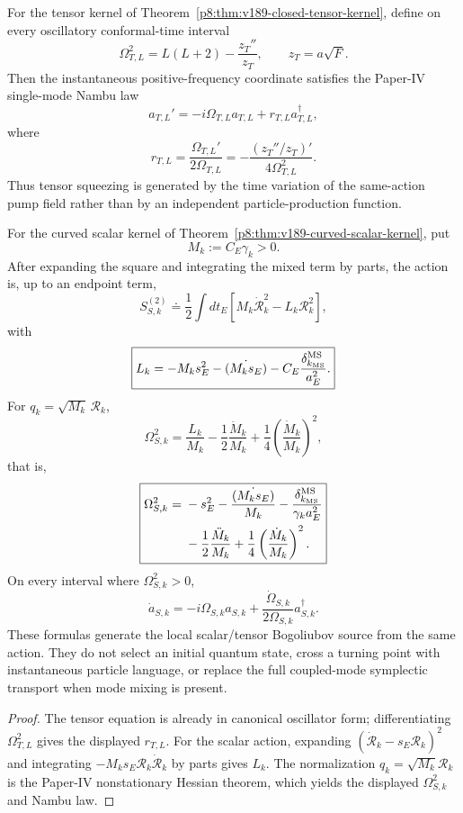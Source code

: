 \documentclass[12pt,a4paper]{article}
\begin{document}
\begin{theorem}
\label{p8:thm:v245-canonical-cosmological-oscillators}
For the tensor kernel of
Theorem~\ref{p8:thm:v189-closed-tensor-kernel}, define on every oscillatory
conformal-time interval
\[
 \boxed{\Omega_{T,L}^2
 =L(L+2)-\frac{z_T''}{z_T}},\qquad z_T=a\sqrt F.
\]
Then the instantaneous positive-frequency coordinate satisfies the Paper-IV
single-mode Nambu law
\[
 \boxed{a_{T,L}'=-i\Omega_{T,L}a_{T,L}
 +r_{T,L}a_{T,L}^\dagger},
\]
where
\[
 \boxed{r_{T,L}=\frac{\Omega_{T,L}'}{2\Omega_{T,L}}
 =-\frac{(z_T''/z_T)'}{4\Omega_{T,L}^2}.}
\]
Thus tensor squeezing is generated by the time variation of the same-action
pump field rather than by an independent particle-production function.

For the curved scalar kernel of
Theorem~\ref{p8:thm:v189-curved-scalar-kernel}, put
\[
 M_k:=C_E\gamma_k>0.
\]
After expanding the square and integrating the mixed term by parts, the action
is, up to an endpoint term,
\[
 S_{S,k}^{(2)}\doteq\frac12\int dt_E
 \left[M_k\dot{\mathcal R}_k^2-L_k\mathcal R_k^2\right],
\]
with
\[
 \boxed{L_k=-M_ks_E^2-\dot{(M_ks_E)}
 -C_E\frac{\delta_{k_{\rm MS}}^{\rm MS}}{a_E^2}.}
\]
For \(q_k=\sqrt{M_k}\,\mathcal R_k\),
\[
 \boxed{
 \Omega_{S,k}^2
 =\frac{L_k}{M_k}
 -\frac12\frac{\ddot M_k}{M_k}
 +\frac14\left(\frac{\dot M_k}{M_k}\right)^2,}
\]
that is,
\[
 \boxed{\begin{aligned}
 \Omega_{S,k}^2={}&-s_E^2
 -\frac{\dot{(M_ks_E)}}{M_k}
 -\frac{\delta_{k_{\rm MS}}^{\rm MS}}{\gamma_k a_E^2}\\
 &-\frac12\frac{\ddot M_k}{M_k}
 +\frac14\left(\frac{\dot M_k}{M_k}\right)^2.
 \end{aligned}}
\]
On every interval where \(\Omega_{S,k}^2>0\),
\[
 \boxed{\dot a_{S,k}=-i\Omega_{S,k}a_{S,k}
 +\frac{\dot\Omega_{S,k}}{2\Omega_{S,k}}a_{S,k}^\dagger.}
\]
These formulas generate the local scalar/tensor Bogoliubov source from the
same action.  They do not select an initial quantum state, cross a turning
point with instantaneous particle language, or replace the full coupled-mode
symplectic transport when mode mixing is present.
\end{theorem}

\begin{proof}
The tensor equation is already in canonical oscillator form; differentiating
\(\Omega_{T,L}^2\) gives the displayed \(r_{T,L}\).  For the scalar action,
expanding \((\dot{\mathcal R}_k-s_E\mathcal R_k)^2\) and integrating
\(-M_ks_E\mathcal R_k\dot{\mathcal R}_k\) by parts gives \(L_k\).
The normalization \(q_k=\sqrt{M_k}\mathcal R_k\) is the Paper-IV
nonstationary Hessian theorem, which yields the displayed \(\Omega_{S,k}^2\)
and Nambu law.
\end{proof}
\end{document}
